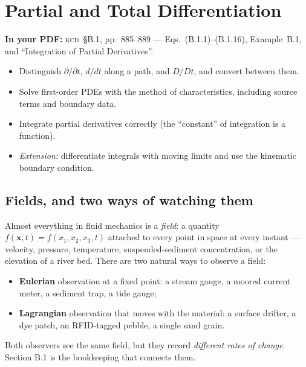 \documentclass[11pt,letterpaper]{article}
\numberwithin{equation}{section}
\newcommand{\xx}{\mathbf{x}}
\newcommand{\Kundu}{\textnormal{\textsc{kcd}}}   %
\begin{document}
\clearpage
\tableofcontents
\clearpage
{}

\clearpage
\section{Partial and Total Differentiation}\label{sec:B1}
\begin{source}
\textbf{In your PDF:} \Kundu\ \S B.1, pp.~885--889 --- Eqs.~(B.1.1)--(B.1.16), Example~B.1,
and ``Integration of Partial Derivatives''.
\end{source}

\begin{goals}
\begin{itemize}
  \item Distinguish $\partial/\partial t$, $d/dt$ along a path, and $D/Dt$, and convert between them.
  \item Solve first-order PDEs with the method of characteristics, including source terms and boundary data.
  \item Integrate partial derivatives correctly (the ``constant'' of integration is a function).
  \item \emph{Extension:} differentiate integrals with moving limits and use the kinematic boundary condition.
\end{itemize}
\end{goals}

\subsection{Fields, and two ways of watching them}
Almost everything in fluid mechanics is a \emph{field}: a quantity $f(\xx,t)=f(x_1,x_2,x_3,t)$ attached to every
point in space at every instant --- velocity, pressure, temperature, suspended-sediment concentration, or the
elevation of a river bed. There are two natural ways to observe a field:
\begin{itemize}
  \item \textbf{Eulerian} observation at a fixed point: a stream gauge, a moored current meter, a sediment trap, a tide gauge;
  \item \textbf{Lagrangian} observation that moves with the material: a surface drifter, a dye patch, an RFID-tagged pebble, a single sand grain.
\end{itemize}
Both observers see the same field, but they record \emph{different rates of change}. Section B.1 is the
bookkeeping that connects them.
\end{document}
